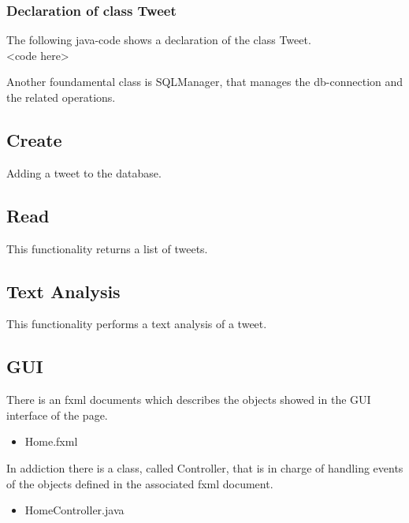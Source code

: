 \documentclass[a4paper, oneside]{article}
\begin{document}
\subsubsection{Declaration of class Tweet}
The following java-code shows a declaration of the class Tweet.
\vspace{2mm}
\\ <code here>
\vspace{5mm}

Another foundamental class is SQLManager, that manages the db-connection and the related operations.

\subsection{Create}
Adding a tweet to the database.
\vspace{2mm}
 \\<Code here>
\vspace{5mm}

\subsection{Read}
This functionality returns a list of tweets.
\vspace{2mm}
\\<code here>
\vspace{5mm}

\clearpage

\subsection{Text Analysis}
This functionality performs a text analysis of a tweet.
\vspace{2mm}
\\<code here>
\vspace{5mm}

\clearpage

\subsection{GUI}
There is an fxml documents which describes the objects showed in the GUI interface of the  page.
\begin{itemize}
\item Home.fxml
\end{itemize}
In addiction there is a class, called Controller, that is in charge of handling events of the objects defined in the associated fxml document.
\begin{itemize}
\item HomeController.java
\end{itemize}
\end{document}
